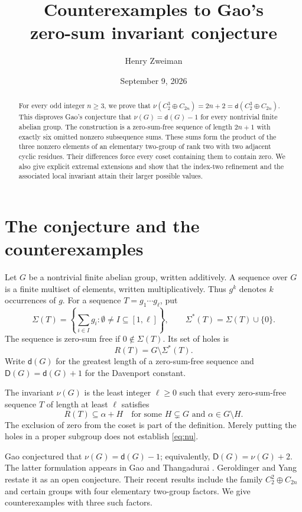 \documentclass[11pt]{article}
\title{Counterexamples to Gao's\protect\\zero-sum invariant conjecture}
\author{Henry Zweiman}
\date{September 9, 2026}
\theoremstyle{definition}
\newcommand{\D}{\mathsf D}
\newcommand{\dd}{\mathsf d}
\begin{document}
\maketitle
\begin{abstract}
For every odd integer $n\geq3$, we prove that $\nu(C_2^3\oplus C_{2n})=2n+2=\dd(C_2^3\oplus C_{2n})$. This disproves Gao's conjecture that $\nu(G)=\dd(G)-1$ for every nontrivial finite abelian group. The construction is a zero-sum-free sequence of length $2n+1$ with exactly six omitted nonzero subsequence sums. These sums form the product of the three nonzero elements of an elementary two-group of rank two with two adjacent cyclic residues. Their differences force every coset containing them to contain zero. We also give explicit extremal extensions and show that the index-two refinement and the associated local invariant attain their larger possible values.
\end{abstract}

\section{The conjecture and the counterexamples}

Let $G$ be a nontrivial finite abelian group, written additively. A sequence over $G$ is a finite multiset of elements, written multiplicatively. Thus $g^k$ denotes $k$ occurrences of $g$. For a sequence $T=g_1\cdots g_\ell$, put
\[
 \Sigma(T)=\left\{\sum_{i\in I}g_i:\emptyset\neq I\subseteq[1,\ell]\right\},
 \qquad \Sigma^*(T)=\Sigma(T)\cup\{0\}.
\]
The sequence is zero-sum free if $0\notin\Sigma(T)$. Its set of holes is
\[
 R(T)=G\setminus\Sigma^*(T).
\]
Write $\dd(G)$ for the greatest length of a zero-sum-free sequence and $\D(G)=\dd(G)+1$ for the Davenport constant.

The invariant $\nu(G)$ is the least integer $\ell\geq0$ such that every zero-sum-free sequence $T$ of length at least $\ell$ satisfies
\begin{equation}\label{eq:nu}
 R(T)\subseteq\alpha+H
 \quad\text{for some }H\subsetneq G\text{ and }\alpha\in G\setminus H.
\end{equation}
The exclusion of zero from the coset is part of the definition. Merely putting the holes in a proper subgroup does not establish \eqref{eq:nu}.

Gao conjectured that $\nu(G)=\dd(G)-1$; equivalently, $\D(G)=\nu(G)+2$. The latter formulation appears in Gao and Thangadurai \cite[Definition 3 and Conjecture 4]{GT}. Geroldinger and Yang \cite[Introduction and Section 6]{GY} restate it as an open conjecture. Their recent results include the family $C_2^2\oplus C_{2n}$ and certain groups with four elementary two-group factors. We give counterexamples with three such factors.
\end{document}
